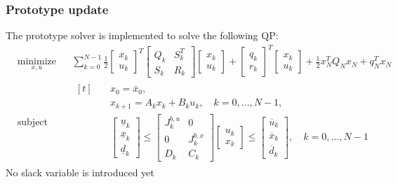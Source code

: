 \documentclass[10pt,aspectratio=1610]{beamer} %
\begin{document}
\begin{frame}
    \frametitle{Prototype update}
    The prototype solver is implemented to solve the following QP:
    \begin{equation*}
    \begin{aligned}
        & \underset{x, u}{\text{minimize}} 
        & & \sum_{k=0}^{N-1} \frac{1}{2} \begin{bmatrix} x_k \\ u_k \end{bmatrix}^T \begin{bmatrix} Q_k & S_k^T \\ S_k & R_k \end{bmatrix} \begin{bmatrix} x_k \\ u_k \end{bmatrix} + \begin{bmatrix} q_k \\ r_k \end{bmatrix}^T \begin{bmatrix} x_k \\ u_k \end{bmatrix} + \frac{1}{2} x_N^T Q_N x_N + q_N^T x_N \\
        & \text{subject to} 
        & & \begin{aligned}[t]
                & \quad x_0 = \bar{x}_0, \\
                & \quad x_{k+1} = A_k x_k + B_k u_k, \quad k = 0, \dots, N-1, \\
                & \quad \begin{bmatrix} \underline{u}_k \\ \underline{x}_k \\ \underline{d}_k \end{bmatrix} \le \begin{bmatrix} J_k^{b,u} & 0 \\ 0 & J_k^{b,x} \\ D_k & C_k \end{bmatrix} \begin{bmatrix} u_k \\ x_k \end{bmatrix} \le \begin{bmatrix} \overline{u}_k \\ \overline{x}_k \\ \overline{d}_k \end{bmatrix}, \quad k = 0, \dots, N-1
            \end{aligned}
    \end{aligned}
    \end{equation*}
    No slack variable is introduced yet
\end{frame}
\end{document}
